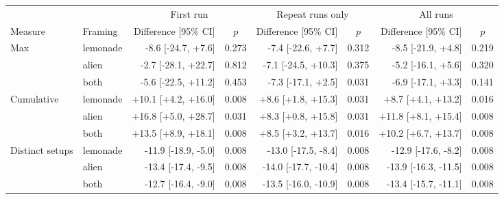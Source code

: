 \begin{tabular}{l l rc rc rc}
\toprule
 & & \multicolumn{2}{c}{First run} & \multicolumn{2}{c}{Repeat runs only} & \multicolumn{2}{c}{All runs} \\
\cmidrule(lr){3-4} \cmidrule(lr){5-6} \cmidrule(lr){7-8}
Measure & Framing & Difference [95\% CI] & $p$ & Difference [95\% CI] & $p$ & Difference [95\% CI] & $p$ \\
\midrule
Max & lemonade & -8.6 [-24.7, +7.6] & 0.273 & -7.4 [-22.6, +7.7] & 0.312 & -8.5 [-21.9, +4.8] & 0.219 \\
 & alien & -2.7 [-28.1, +22.7] & 0.812 & -7.1 [-24.5, +10.3] & 0.375 & -5.2 [-16.1, +5.6] & 0.320 \\
 & both & -5.6 [-22.5, +11.2] & 0.453 & -7.3 [-17.1, +2.5] & 0.031 & -6.9 [-17.1, +3.3] & 0.141 \\
\addlinespace
Cumulative & lemonade & +10.1 [+4.2, +16.0] & 0.008 & +8.6 [+1.8, +15.3] & 0.031 & +8.7 [+4.1, +13.2] & 0.016 \\
 & alien & +16.8 [+5.0, +28.7] & 0.031 & +8.3 [+0.8, +15.8] & 0.031 & +11.8 [+8.1, +15.4] & 0.008 \\
 & both & +13.5 [+8.9, +18.1] & 0.008 & +8.5 [+3.2, +13.7] & 0.016 & +10.2 [+6.7, +13.7] & 0.008 \\
\addlinespace
Distinct setups & lemonade & -11.9 [-18.9, -5.0] & 0.008 & -13.0 [-17.5, -8.4] & 0.008 & -12.9 [-17.6, -8.2] & 0.008 \\
 & alien & -13.4 [-17.4, -9.5] & 0.008 & -14.0 [-17.7, -10.4] & 0.008 & -13.9 [-16.3, -11.5] & 0.008 \\
 & both & -12.7 [-16.4, -9.0] & 0.008 & -13.5 [-16.0, -10.9] & 0.008 & -13.4 [-15.7, -11.1] & 0.008 \\
\bottomrule
\end{tabular}